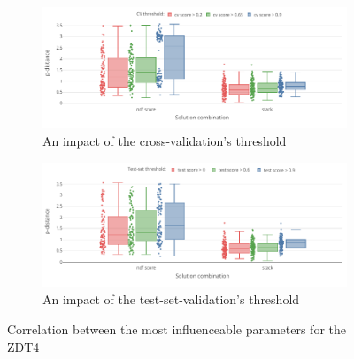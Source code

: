     \begin{figure}
        \centering

        \begin{subfigure}{\textwidth}
            \includegraphics[width=\textwidth]{content/images/conf_zdt4_cv_score}
            \caption{An impact of the cross-validation's threshold}
            \label{fig:zdt4_pred_solver}
        \end{subfigure} 
        \begin{subfigure}{\textwidth}
            \includegraphics[width=\textwidth]{content/images/conf_zdt4_test_score}
            \caption{An impact of the test-set-validation's threshold}
            \label{fig:zdt4_comb_valid}
        \end{subfigure}

        \caption[Correlation between the most influenceable parameters for the ZDT4]{Correlation between the most influenceable parameters for the ZDT4} 
        \label{fig:conf_zdt6}    
    \end{figure}

